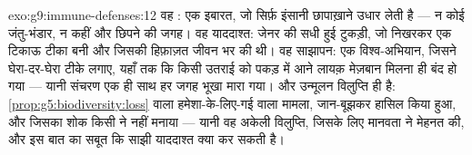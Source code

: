 \begin{solution}{exo:g9:immune-defenses:12}
वह : एक इबारत, जो सिर्फ़ इंसानी छापाख़ाने उधार लेती है --- न कोई
जंतु-भंडार, न कहीं और छिपने की जगह। वह याददाश्त: जेनर की सधी हुई टुकड़ी,
जो निखरकर एक टिकाऊ टीका बनी और जिसकी हिफ़ाज़त जीवन भर की थी। वह साझापन:
एक विश्व-अभियान, जिसने घेरा-दर-घेरा टीके लगाए, यहाँ तक कि किसी उतराई को
पकड़ में आने लायक़ मेज़बान मिलना ही बंद हो गया --- यानी संचरण एक ही साथ हर
जगह भूखा मारा गया। और उन्मूलन विलुप्ति ही है:
\cref{prop:g5:biodiversity:loss} वाला हमेशा-के-लिए-गई  वाला मामला,
जान-बूझकर हासिल किया हुआ, और जिसका शोक किसी ने नहीं मनाया --- यानी वह
अकेली विलुप्ति, जिसके लिए मानवता ने मेहनत की, और इस बात का सबूत कि साझी
याददाश्त क्या कर सकती है।
\end{solution}

